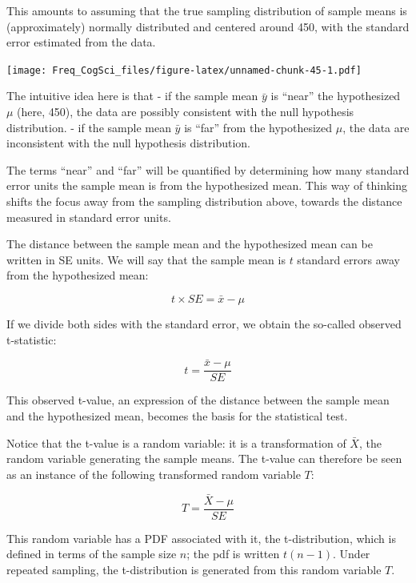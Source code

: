 \documentclass[12pt,]{krantz}
\begin{document}
This amounts to assuming that the true sampling distribution of sample means is (approximately) normally distributed and centered around 450, with the standard error estimated from the data.

\texttt{[image: Freq\_CogSci\_files/figure-latex/unnamed-chunk-45-1.pdf]}

The intuitive idea here is that
- if the sample mean \(\bar{y}\) is ``near'' the hypothesized \(\mu\) (here, 450), the data are possibly consistent with the null hypothesis distribution.
- if the sample mean \(\bar{y}\) is ``far'' from the hypothesized \(\mu\), the data are inconsistent with the null hypothesis distribution.

The terms ``near'' and ``far'' will be quantified by determining how many standard error units the sample mean is from the hypothesized mean. This way of thinking shifts the focus away from the sampling distribution above, towards the distance measured in standard error units.

The distance between the sample mean and the hypothesized mean can be written in SE units. We will say that the sample mean is \(t\) standard errors away from the hypothesized mean:

\begin{equation}
t \times SE = \bar{x} - \mu 
\end{equation}

If we divide both sides with the standard error, we obtain the so-called observed t-statistic:

\begin{equation}
t  = \frac{\bar{x} - \mu}{SE}
\end{equation}

This observed t-value, an expression of the distance between the sample mean and the hypothesized mean, becomes the basis for the statistical test.

Notice that the t-value is a random variable: it is a transformation of \(\bar{X}\), the random variable generating the sample means. The t-value can therefore be seen as an instance of the following transformed random variable \(T\):

\begin{equation}
T  = \frac{\bar{X} - \mu}{SE}
\end{equation}

This random variable has a PDF associated with it, the t-distribution, which is defined in terms of the sample size \(n\); the pdf is written \(t(n-1)\). Under repeated sampling, the t-distribution is generated from this random variable \(T\).
\end{document}
